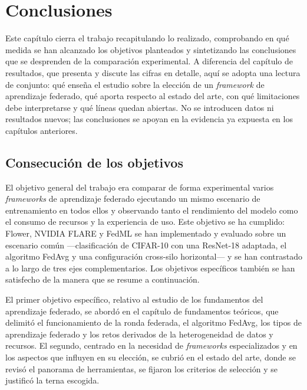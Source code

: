 \chapter{Conclusiones}
\label{chap:conclusiones}

Este capítulo cierra el trabajo recapitulando lo realizado, comprobando en qué medida
se han alcanzado los objetivos planteados y sintetizando las conclusiones que se
desprenden de la comparación experimental. A diferencia del capítulo de resultados,
que presenta y discute las cifras en detalle, aquí se adopta una lectura de conjunto:
qué enseña el estudio sobre la elección de un \textit{framework} de aprendizaje federado, qué
aporta respecto al estado del arte, con qué limitaciones debe interpretarse y qué
líneas quedan abiertas. No se introducen datos ni resultados nuevos; las conclusiones
se apoyan en la evidencia ya expuesta en los capítulos anteriores.

\section{Consecución de los objetivos}
\label{sec:consecucion-objetivos}

El objetivo general del trabajo era comparar de forma experimental varios \textit{frameworks}
de aprendizaje federado ejecutando un mismo escenario de entrenamiento en todos ellos
y observando tanto el rendimiento del modelo como el consumo de recursos y la
experiencia de uso. Este objetivo se ha cumplido: Flower, NVIDIA FLARE y FedML se han
implementado y evaluado sobre un escenario común —clasificación de CIFAR-10 con una
ResNet-18 adaptada, el algoritmo FedAvg y una configuración cross-silo horizontal— y
se han contrastado a lo largo de tres ejes complementarios. Los objetivos específicos
también se han satisfecho de la manera que se resume a continuación.

El primer objetivo específico, relativo al estudio de los fundamentos del aprendizaje
federado, se abordó en el capítulo de fundamentos teóricos, que delimitó el
funcionamiento de la ronda federada, el algoritmo FedAvg, los tipos de aprendizaje
federado y los retos derivados de la heterogeneidad de datos y recursos. El segundo,
centrado en la necesidad de \textit{frameworks} especializados y en los aspectos que influyen
en su elección, se cubrió en el estado del arte, donde se revisó el panorama de
herramientas, se fijaron los criterios de selección y se justificó la terna escogida.

